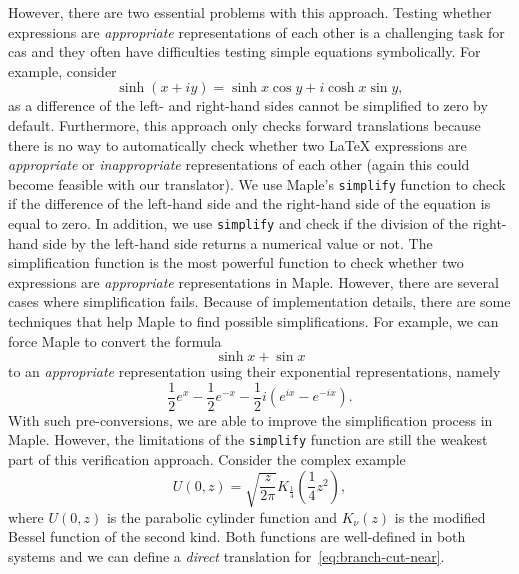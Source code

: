 \documentclass[a4paper,11pt]{article}
\newcommand{\Maple}{Maple}
\theoremstyle{defTheoStyle}
\theoremstyle{defExampStyle}
\DeclareRobustCommand{\cpi}{{\pi}}
\DeclareRobustCommand{\expe}{{e}}
\DeclareRobustCommand{\iunit}{{i}}
\begin{document}
However, there are two essential problems with this approach. Testing whether expressions are {\it appropriate} representations of each other is a challenging task for \gls*{cas} and they often have difficulties testing simple equations symbolically. For example, 
consider
\parencite[(4.35.34)]{NIST:DLMF}
\begin{equation*}
\sinh \left( x+\iunit y \right) = \sinh x \cos y + \iunit \cosh x \sin y,
\end{equation*}
as a difference of the left- and right-hand sides cannot be simplified to zero by default. Furthermore, this approach only checks forward translations because there is no way to automatically check whether two \LaTeX{} expressions are {\it appropriate} or {\it inappropriate} representations of each other (again this could become feasible with our translator). We use \Maple's \texttt{simplify} function to check if the difference of the left-hand side and the right-hand side of the equation is equal to zero. In addition, we use \texttt{simplify} and check if the division of the right-hand side by the left-hand side returns a numerical value or not. The simplification function is the most powerful function to check whether two expressions are {\it appropriate} representations in \Maple. However, there are several cases where simplification fails. Because of implementation details, there are some techniques that help \Maple{} to find possible simplifications. For example, we can force \Maple{} to convert the formula
\begin{equation}
\sinh{x} + \sin{x}
\end{equation}
to an {\it appropriate} representation using their exponential representations, namely
\begin{equation}
\frac{1}{2}\expe^x - \frac{1}{2}\expe^{-x} - \frac{1}{2} \iunit \left( \expe^{\iunit x}-\expe^{-\iunit x} \right).
\end{equation}
With such pre-conversions, we are able to improve the simplification process in \Maple. However, the limitations of the \texttt{simplify} function are still the weakest part of this verification approach. Consider the complex example~\parencite[(12.7.10)]{NIST:DLMF}
\begin{equation}\label{eq:branch-cut-near}
\displaystyle U(0,z) = \sqrt{\frac{z}{2\cpi}} K_{\frac{1}{4}}\left(\frac{1}{4}z^2\right),
\end{equation}
where $U(0,z)$ is the parabolic cylinder function and $K_\nu(z)$ is the modified Bessel function of the second kind. Both functions are well-defined in both systems and we can define a \textit{direct} translation for~\eqref{eq:branch-cut-near}. 
\end{document}
